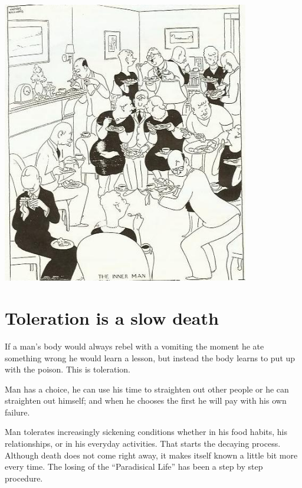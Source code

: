 \documentclass[landscape,twocolumn,letterpaper]{article}
\begin{document}
\includegraphics[width=4.25in,bb= 0 0 454 521]{p20.jpg}


\section{Toleration is a slow death}
\label{sec:tiasd}

If a man's body would always rebel with a vomiting the moment he ate
something wrong he would learn a lesson, but instead the body learns
to put up with the poison. This is toleration.

Man has a choice, he can use his time to straighten out other people
or he can straighten out himself; and when he chooses the first he
will pay with his own failure.

Man tolerates increasingly sickening conditions whether in his food
habits, his relationships, or in his everyday activities. That starts
the decaying process. Although death does not come right away, it
makes itself known a little bit more every time. The losing of the
``Paradisical Life'' has been a step by step procedure.
\end{document}
